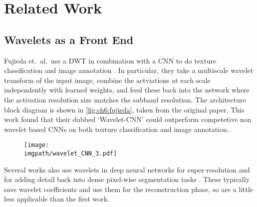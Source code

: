 \section{Related Work}\label{sec:ch6:related}

\subsection{Wavelets as a Front End}
Fujieda et.\ al.\ use a DWT in combination with a
CNN to do texture classification and image annotation 
\cite{fujieda_wavelet_2017, fujieda_wavelet_2018}. In particular, they take a
multiscale wavelet transform of the input image, combine the actviations at each
scale independently with learned weights, and feed these back into the network
where the activation resolution size matches the subband resolution. The
architecture block diagram is shown in \autoref{fig:ch6:fujieda}, taken from the
original paper.  This work found that their dubbed `Wavelet-CNN' could
outperform competetive non wavelet based CNNs on both texture classification and
image annotation.

\begin{figure}[bt]
  \centering
  \texttt{[image: \\imgpath/wavelet\_CNN\_3.pdf]}
  \label{fig:ch6:fujieda}
\end{figure}

Several works also use wavelets in deep neural networks for super-resolution
\cite{guo_deep_2017} and for adding detail back into dense pixel-wise
segmentation tasks \cite{ma_detailed_2018}. These typically save wavelet
coefficients and use them for the reconstruction phase, so are a little less
applicable than the first work.

